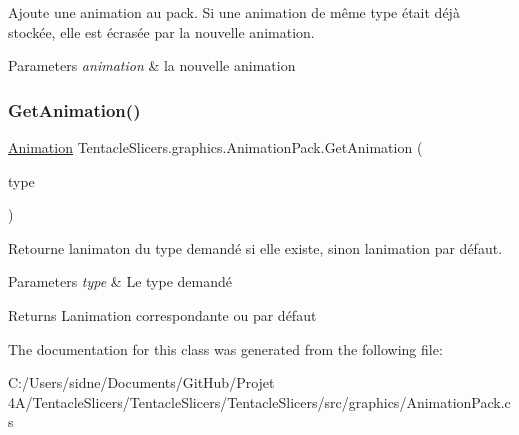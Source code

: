 Ajoute une animation au pack. Si une animation de même type était déjà stockée, elle est écrasée par la nouvelle animation. 


\begin{DoxyParams}{Parameters}
{\em animation} & la nouvelle animation \\
\hline
\end{DoxyParams}
\mbox{\label{class_tentacle_slicers_1_1graphics_1_1_animation_pack_aa5912590d9054955b33919ecc99c2f49}} 
\subsubsection{\texorpdfstring{Get\+Animation()}{GetAnimation()}}
{\footnotesize\ttfamily \hyperlink{class_tentacle_slicers_1_1graphics_1_1_animation}{Animation} Tentacle\+Slicers.\+graphics.\+Animation\+Pack.\+Get\+Animation (\begin{DoxyParamCaption}\item[{\hyperlink{namespace_tentacle_slicers_1_1graphics_a9c92bd633d714099730f10897a01950b}{Animation\+Type}}]{type }\end{DoxyParamCaption})}



Retourne l\textquotesingle{}animaton du type demandé si elle existe, sinon l\textquotesingle{}animation par défaut. 


\begin{DoxyParams}{Parameters}
{\em type} & Le type demandé \\
\hline
\end{DoxyParams}
\begin{DoxyReturn}{Returns}
L\textquotesingle{}animation correspondante ou par défaut 
\end{DoxyReturn}


The documentation for this class was generated from the following file\+:\begin{DoxyCompactItemize}
\item 
C\+:/\+Users/sidne/\+Documents/\+Git\+Hub/\+Projet 4\+A/\+Tentacle\+Slicers/\+Tentacle\+Slicers/\+Tentacle\+Slicers/src/graphics/Animation\+Pack.\+cs\end{DoxyCompactItemize}
